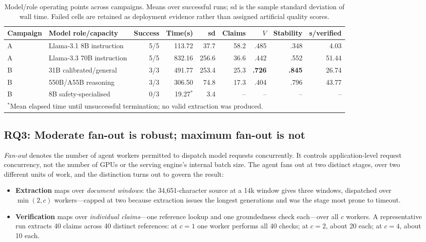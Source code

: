 \documentclass[conference]{IEEEtran}
\begin{document}
\begin{table}[t]
\caption{Model/role operating points across campaigns. Means over successful runs; sd is the sample standard deviation of wall time. Failed cells are retained as deployment evidence rather than assigned artificial quality scores.}
\label{tab:models}
\centering\scriptsize
\begin{tabular}{llrrrrrrr}
\toprule
Campaign & Model role/capacity & Success & Time(s) & sd & Claims & $V$ & Stability & s/verified\\
\midrule
A & Llama-3.1 8B instruction & 5/5 & 113.72 & 37.7 & 58.2 & .485 & .348 & 4.03\\
A & Llama-3.3 70B instruction & 5/5 & 832.16 & 256.6 & 36.6 & .442 & .552 & 51.44\\
B & 31B calibrated/general & 3/3 & 491.77 & 253.4 & 25.3 & \textbf{.726} & \textbf{.845} & 26.74\\
B & 550B/A55B reasoning & 3/3 & 306.50 & 74.8 & 17.3 & .404 & .796 & 43.77\\
B & 8B safety-specialised & 0/3 & 19.27$^*$ & 3.4 & -- & -- & -- & --\\
\bottomrule
\multicolumn{9}{l}{\scriptsize $^*$Mean elapsed time until unsuccessful termination; no valid extraction was produced.}
\end{tabular}
\end{table}

\subsection{RQ3: Moderate fan-out is robust; maximum fan-out is not}
\emph{Fan-out} denotes the number of agent workers permitted to dispatch model requests concurrently. It controls application-level request concurrency, not the number of GPUs or the serving engine's internal batch size. The agent fans out at two distinct stages, over two different units of work, and the distinction turns out to govern the result:

\begin{itemize}
\item \textbf{Extraction} maps over \emph{document windows}: the 34{,}651-character source at a 14k window gives three windows, dispatched over $\min(2,c)$ workers---capped at two because extraction issues the longest generations and was the stage most prone to timeout.
\item \textbf{Verification} maps over \emph{individual claims}---one reference lookup and one groundedness check each---over all $c$ workers. A representative run extracts 40 claims across 40 distinct references: at $c=1$ one worker performs all 40 checks; at $c=2$, about 20 each; at $c=4$, about 10 each.
\end{itemize}
\end{document}
